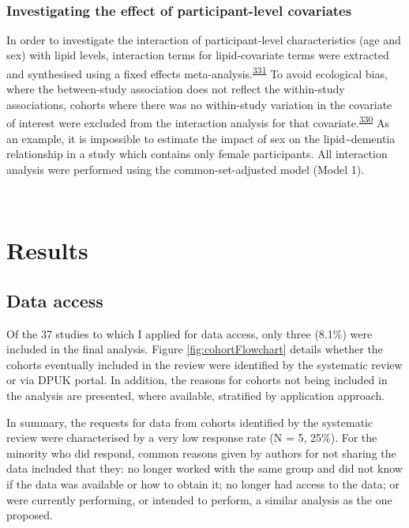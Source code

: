 \documentclass[a4paper, twoside]{templates/ociamthesis}
\begin{document}
~

\hypertarget{investigating-the-effect-of-participant-level-covariates}{%
\subsubsection{Investigating the effect of participant-level covariates}\label{investigating-the-effect-of-participant-level-covariates}}

In order to investigate the interaction of participant-level characteristics (age and sex) with lipid levels, interaction terms for lipid-covariate terms were extracted and synthesised using a fixed effects meta-analysis.\textsuperscript{\protect\hyperlink{ref-fisher2017}{331}} To avoid ecological bias, where the between-study association does not reflect the within-study associations, cohorts where there was no within-study variation in the covariate of interest were excluded from the interaction analysis for that covariate.\textsuperscript{\protect\hyperlink{ref-burke2017}{330}} As an example, it is impossible to estimate the impact of sex on the lipid\textasciitilde dementia relationship in a study which contains only female participants. All interaction analysis were performed using the common-set-adjusted model (Model 1).

~

\hypertarget{results-1}{%
\section{Results}\label{results-1}}

\hypertarget{data-access}{%
\subsection{Data access}\label{data-access}}

Of the 37 studies to which I applied for data access, only three (8.1\%) were included in the final analysis. Figure \ref{fig:cohortFlowchart} details whether the cohorts eventually included in the review were identified by the systematic review or via DPUK portal. In addition, the reasons for cohorts not being included in the analysis are presented, where available, stratified by application approach.

In summary, the requests for data from cohorts identified by the systematic review were characterised by a very low response rate (N = 5, 25\%). For the minority who did respond, common reasons given by authors for not sharing the data included that they: no longer worked with the same group and did not know if the data was available or how to obtain it; no longer had access to the data; or were currently performing, or intended to perform, a similar analysis as the one proposed.
\end{document}
